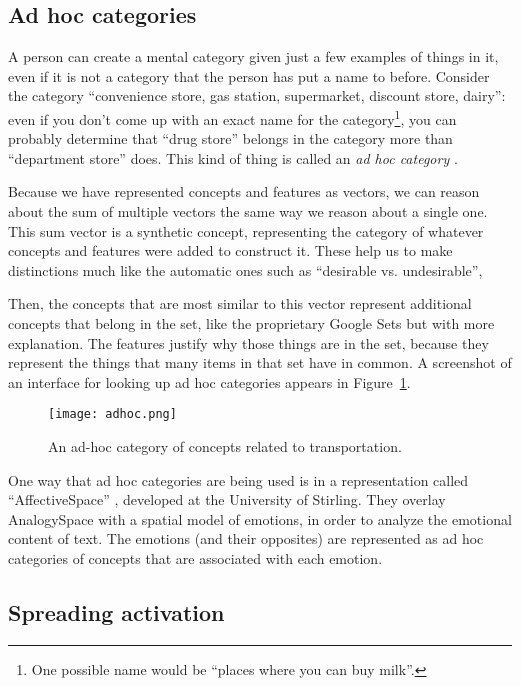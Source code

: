 \documentclass[11pt]{article}
\begin{document}
\subsection{Ad hoc categories}

A person can create a mental category given just a few examples of things in
it, even if it is not a category that the person has put a name to before.
Consider the category ``convenience store, gas station, supermarket, discount
store, dairy'': even if you don't come up with an exact name for the
category\footnote{One possible name would be ``places where you can buy
milk''.}, you can probably determine that ``drug store'' belongs in the category
more than ``department store'' does. This kind of thing is called an {\em ad hoc category} \cite{gl-paper}.

Because we have represented concepts and features as vectors, we can reason about the sum of multiple vectors the same way we reason about a single one. This sum vector is a synthetic concept, representing the category of whatever concepts and features were added to construct it. These help us to make distinctions much like the automatic ones such as ``desirable vs. undesirable'', 

Then, the concepts that are most similar to this vector represent additional concepts that belong in the set, like the proprietary Google Sets but with more explanation. The features justify why those things are in the set, because they represent the things that many items in that set have in common. A screenshot of an interface for looking up ad hoc categories appears in Figure~\ref{adhoc}.

\begin{figure}[h]
\begin{center}
\texttt{[image: adhoc.png]}
\end{center}
\vspace{-2em}
\caption{An ad-hoc category of concepts related to transportation.}
\label{adhoc}
\end{figure}

One way that ad hoc categories are being used is in a representation called
``AffectiveSpace'' \cite{WOMSA}, developed at the University of Stirling.
They overlay AnalogySpace with a spatial model of emotions, in order to analyze
the emotional content of text. The emotions (and their opposites) are
represented as ad hoc categories of concepts that are associated with each
emotion.

\subsection{Spreading activation}
\end{document}
